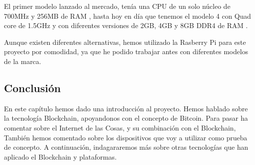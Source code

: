 \vspace{5mm}

\noindent El primer modelo lanzado al mercado, tenía una CPU de un solo núcleo de 700MHz y 256MB de RAM 
\cite{what-is-rasp2}, hasta hoy en día que tenemos el modelo 4 con Quad core de 1.5GHz y con diferentes versiones de 
2GB, 4GB y 8GB DDR4 de RAM \cite{rasp-model-4-specifications}.

\vspace{5mm}

\noindent Aunque existen diferentes alternativas, hemos utilizado la Rasberry Pi para este proyecto por comodidad, ya 
que he podido trabajar antes con diferentes modelos de la marca.

\subsection{Conclusión}

En este capítulo hemos dado una introducción al proyecto. Hemos hablado sobre la tecnología Blockchain, apoyandonos 
con el concepto de Bitcoin. Para pasar ha comentar sobre el Internet de las Cosas, y su combinación con el Blockchain, 
También hemos comentado sobre los dispositivos que voy a utilizar como prueba de concepto. A continuación, indagararemos 
más sobre otras tecnologías que han aplicado el Blockchain y plataformas.

\newpage